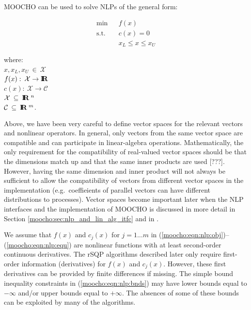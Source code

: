 \documentclass[pdf,ps2pdf,11pt]{SANDreport}
\begin{document}
MOOCHO can be used to solve NLPs of the general form: 

{\bsinglespace
\begin{eqnarray}
\mbox{min}  &  & f(x)                     \label{moocho:eqn:nlp:obj} \\
\mbox{s.t.} &  & c(x) = 0                 \label{moocho:eqn:nlp:equ} \\
            &  & x_L \leq x    \leq x_U   \label{moocho:eqn:nlp:bnds}
\end{eqnarray}
\begin{tabbing}
\hspace{4ex}where:\hspace{5ex}\= \\
\>	$x, x_L, x_U \:\in\:\mathcal{X}$ \\
\>	$f(x) : \:\mathcal{X} \rightarrow \mbox{\textbf{I}}\hspace{-0.6ex}\mbox{\textbf{R}}$ \\
\>	$c(x) : \:\mathcal{X} \rightarrow \mathcal{C}$ \\
\>	$\mathcal{X} \:\subseteq\:\mbox{\textbf{I}}\hspace{-0.6ex}\mbox{\textbf{R}}\:^n$ \\
\>	$\mathcal{C} \:\subseteq\:\mbox{\textbf{I}}\hspace{-0.6ex}\mbox{\textbf{R}}\:^m$.
\end{tabbing}
\esinglespace}

Above, we have been very careful to define vector spaces for the relevant
vectors and nonlinear operators.  In general, only vectors from the same
vector space are compatible and can participate in linear-algebra operations.
Mathematically, the only requirement for the compatibility of real-valued
vector spaces should be that the dimensions match up and that the same inner
products are used [???].  However, having the same dimension and inner product
will not always be sufficient to allow the compatibility of vectors from
different vector spaces in the implementation (e.g.\ coeffieients of parallel
vectors can have different distributions to processes).  Vector spaces become
important later when the NLP interfaces and the implementation of MOOCHO is
discussed in more detail in Section {}\ref{moocho:sec:nlp_and_lin_alg_itfc}
and in {}\cite{ref:moochodevguide}.

We assume that $f(x)$ and $c_j(x)$ for $j = 1 \ldots m$ in
(\ref{moocho:eqn:nlp:obj})--(\ref{moocho:eqn:nlp:equ}) are nonlinear functions
with at least second-order continuous derivatives.  The rSQP algorithms
described later only require first-order information (derivatives) for $f(x)$
and $c_j(x)$.  However, these first derivatives can be provided by finite
differences if missing.  The simple bound inequality constraints in
(\ref{moocho:eqn:nlp:bnds}) may have lower bounds equal to $-\infty$ and/or
upper bounds equal to $+\infty$.  The absences of some of these bounds can be
exploited by many of the algorithms.
\end{document}
